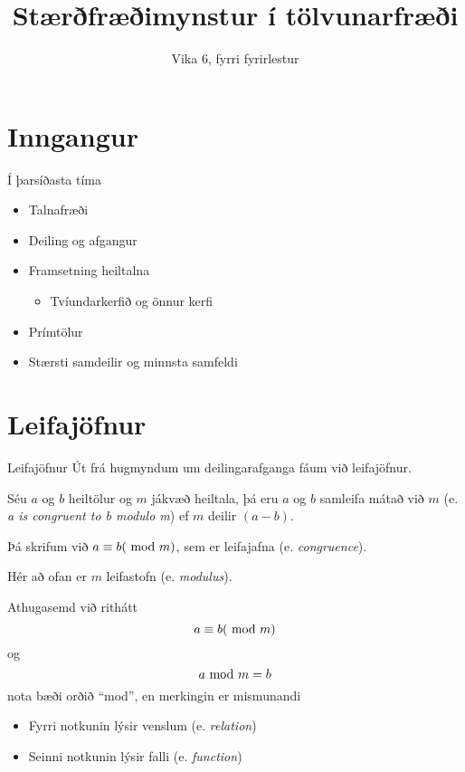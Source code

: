 \documentclass[handout]{beamer}
\title{Stærðfræðimynstur í tölvunarfræði}
\subtitle{Vika 6, fyrri fyrirlestur}
\begin{document}
\begin{frame}
\titlepage
\end{frame}


\section{Inngangur}

\begin{frame}{Í þarsíðasta tíma}
\begin{itemize}
 \item Talnafræði
 \item Deiling og afgangur
 \item Framsetning heiltalna
 \begin{itemize}
  \item Tvíundarkerfið og önnur kerfi
 \end{itemize}
 \item Prímtölur
 \item Stærsti samdeilir og minnsta samfeldi
\end{itemize}
\end{frame}

\section{Leifajöfnur}

\begin{frame}{Leifajöfnur}
    Út frá hugmyndum um deilingarafganga fáum við leifajöfnur.
    \begin{tcolorbox}
        Séu $a$ og $b$ heiltölur og $m$ jákvæð heiltala, þá eru $a$ og $b$ samleifa mátað við $m$ (e. \emph{a is congruent to b modulo m}) ef $m$ deilir $(a-b)$.

        Þá skrifum við $a \equiv b (\ \text{mod}\ m)$, sem er leifajafna (e. \emph{congruence}).
    \end{tcolorbox}
    Hér að ofan er $m$ leifastofn (e. \emph{modulus}).
\end{frame}

\begin{frame}{Athugasemd við rithátt}
    \[a \equiv b (\ \text{mod}\ m)\] og \[a \ \text{mod}\ m = b\] nota bæði orðið ``mod'', en merkingin er mismunandi
    \begin{itemize}
        \item Fyrri notkunin lýsir venslum (e. \emph{relation})
        \item Seinni notkunin lýsir falli (e. \emph{function})
    \end{itemize}    
\end{frame}
\end{document}
